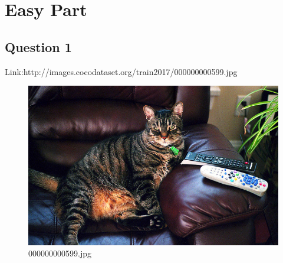 \section{Easy Part}
\subsection{Question 1}
Link:http://images.cocodataset.org/train2017/000000000599.jpg
    \begin{figure}[h]
        \centering
        \includegraphics[width=0.8\linewidth]{../image set/easy/000000000599.jpg}
        \caption{000000000599.jpg}
    \end{figure}
